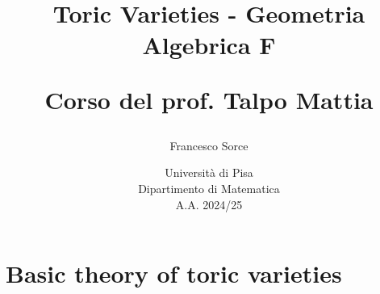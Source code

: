 \documentclass[a4paper]{report}
\title{\huge Toric Varieties - Geometria Algebrica F
\vspace{0.7cm}

\Large Corso del prof. Talpo Mattia}
\author{\Large Francesco Sorce}
\date{Università di Pisa\\
Dipartimento di Matematica\\
A.A. 2024/25}
\begin{document}
\maketitle

\tableofcontents
\newpage



\part{Basic theory of toric varieties}

\end{document}
